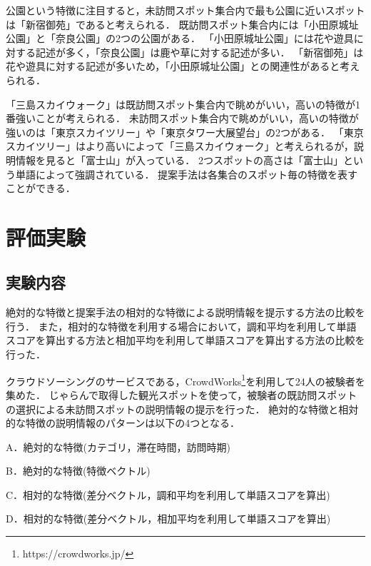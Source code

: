 \documentclass{deimj}
\begin{document}
公園という特徴に注目すると，未訪問スポット集合内で最も公園に近いスポットは「新宿御苑」であると考えられる．
既訪問スポット集合内には「小田原城址公園」と「奈良公園」の2つの公園がある．
「小田原城址公園」には花や遊具に対する記述が多く，「奈良公園」は鹿や草に対する記述が多い．
「新宿御苑」は花や遊具に対する記述が多いため，「小田原城址公園」との関連性があると考えられる．

「三島スカイウォーク」は既訪問スポット集合内で眺めがいい，高いの特徴が1番強いことが考えられる．
未訪問スポット集合内で眺めがいい，高いの特徴が強いのは「東京スカイツリー」や「東京タワー大展望台」の2つがある．
「東京スカイツリー」はより高いによって「三島スカイウォーク」と考えられるが，説明情報を見ると「富士山」が入っている．
2つスポットの高さは「富士山」という単語によって強調されている．
提案手法は各集合のスポット毎の特徴を表すことができる．



\section{評価実験}
\label{sec:評価実験}

\subsection{実験内容}

絶対的な特徴と提案手法の相対的な特徴による説明情報を提示する方法の比較を行う．
また，相対的な特徴を利用する場合において，調和平均を利用して単語スコアを算出する方法と相加平均を利用して単語スコアを算出する方法の比較を行った．

クラウドソーシングのサービスである，CrowdWorks\footnote{https://crowdworks.jp/}を利用して24人の被験者を集めた．
じゃらんで取得した観光スポットを使って，被験者の既訪問スポットの選択による未訪問スポットの説明情報の提示を行った．
絶対的な特徴と相対的な特徴の説明情報のパターンは以下の4つとなる．
\begin{description}
  \item A．絶対的な特徴(カテゴリ，滞在時間，訪問時期)
  \item B．絶対的な特徴(特徴ベクトル)
  \item C．相対的な特徴(差分ベクトル，調和平均を利用して単語スコアを算出)
  \item D．相対的な特徴(差分ベクトル，相加平均を利用して単語スコアを算出)
\end{description}
\end{document}
